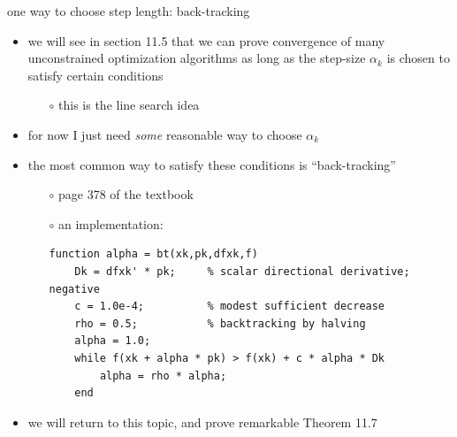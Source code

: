 \documentclass[10pt,hyperref]{beamer}
\begin{document}
\begin{frame}[fragile]{one way to choose step length: back-tracking}

\begin{itemize}
\item we will see in section 11.5 that we can prove convergence of many unconstrained optimization algorithms as long as the step-size $\alpha_k$ is chosen to satisfy certain conditions
    \begin{itemize}
    \item[$\circ$] this is the \alert{line search} idea
    \end{itemize}
\item for now I just need \emph{some} reasonable way to choose $\alpha_k$
\item the most common way to satisfy these conditions is ``back-tracking''
    \begin{itemize}
    \item[$\circ$] page 378 of the textbook
    \item[$\circ$] an implementation:

\medskip
\begin{Verbatim}[fontsize=\scriptsize]
    function alpha = bt(xk,pk,dfxk,f)
    Dk = dfxk' * pk;     % scalar directional derivative; negative
    c = 1.0e-4;          % modest sufficient decrease
    rho = 0.5;           % backtracking by halving
    alpha = 1.0;
    while f(xk + alpha * pk) > f(xk) + c * alpha * Dk
        alpha = rho * alpha;
    end
\end{Verbatim}
    \end{itemize}

\medskip
\item \alert{we will return to this topic}, and prove remarkable Theorem 11.7
\end{itemize}
\end{frame}
\end{document}
